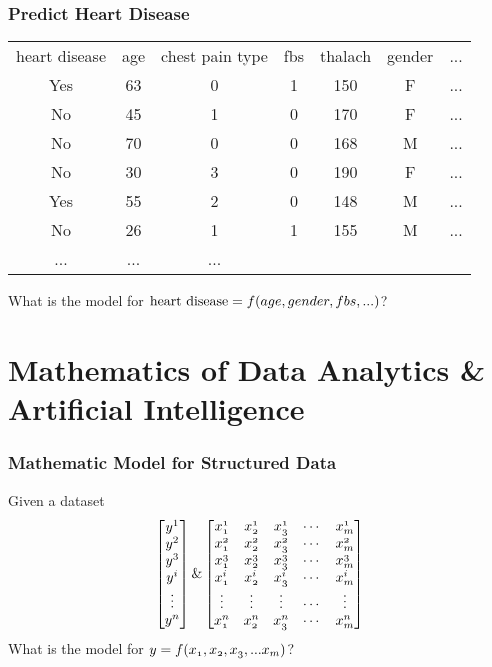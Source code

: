 \documentclass[notheorems, aspectratio=54]{beamer}
\begin{document}
\begin{frame}
\frametitle{Predict Heart Disease}
\begin{table}[]
\begin{tabular} {c c c c c c c}
heart disease &age 	& chest pain type 	& fbs &thalach &gender &...\\ 
Yes		&63 	& 0 				&1 				&150		& F		&...\\
No 		&45 	& 1 				&0 				&170		&F		& ...\\
No 		&70 	& 0  				& 0  			&168		&M		& ...\\
No 		&30 	& 3 				&0 				&190		&F		& ...\\
Yes 	&55 	& 2 				& 0 			&148		&M		&...\\
No 		&26 	& 1 				& 1				&155	&M		&...\\
... & ... & ... & & & &
\end{tabular}
\end{table}
What is the model for $\text{heart disease}=\mathnormal{f}(age, gender, fbs,  ...)$?
\end{frame}

\section{Mathematics of Data Analytics \& Artificial Intelligence }

\begin{frame}
\frametitle{Mathematic Model for Structured Data}
Given a dataset
\[ \begin{bmatrix}  \mathnormal{y}^1 \\ \mathnormal{y}^2\\\mathnormal{y}^3\\\mathnormal{y}^i \\ \vdots \\\mathnormal{y}^n \end{bmatrix}
\&
\begin{bmatrix}
   \mathnormal{x^1_1} &\mathnormal{x^1_2}  &\mathnormal{x^1_3} & \cdots &\mathnormal{x^1_m}\\
   \mathnormal{x^2_1} &\mathnormal{x^2_2} &\mathnormal{x^2_3} & \cdots &\mathnormal{x^2_m}\\
   \mathnormal{x^3_1} &\mathnormal{x^3_2} &\mathnormal{x^3_3} & \cdots &\mathnormal{x^3_m}\\
   \mathnormal{x^i_1} &\mathnormal{x^i_2} &\mathnormal{x^i_3} & \cdots &\mathnormal{x^i_m}\\
   \vdots &\vdots &\vdots & \cdots &\vdots\\
   \mathnormal{x^n_1} &\mathnormal{x^n_2} &\mathnormal{x^n_3} &\cdots &\mathnormal{x^n_m}
  \end{bmatrix}
\]
What is the model for $\mathnormal{y}=\mathnormal{f(x_1, x_2, x_3,  ... x_m)}$?
\end{frame}
\end{document}
